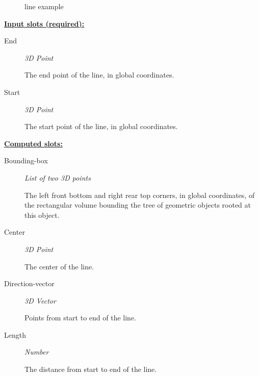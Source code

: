 \documentclass [11pt]{book}
\begin{document}
\begin{itemize}
\begin{figure}
\caption{line example}

\label{fig:line}

\end{figure}





\textbf{
\underline{Input slots (required):}}

\begin{description}

\item [End]
\emph{3D Point}

 The end point of the line, in global coordinates.




\item [Start]
\emph{3D Point}

 The start point of the line, in global coordinates.




\end{description}






\textbf{
\underline{Computed slots:}}

\begin{description}

\item [Bounding-box]
\emph{List of two 3D points}

 The left front bottom and right rear top corners, in global coordinates,
of the rectangular volume bounding the tree of geometric objects rooted at this object.




\item [Center]
\emph{3D Point}

 The center of the line.




\item [Direction-vector]
\emph{3D Vector}

 Points from start to end of the line.




\item [Length]
\emph{Number}

 The distance from start to end of the line.




\end{description}








\end{itemize}
\end{document}
